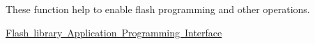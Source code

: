 These function help to enable flash programming and other operations.
\begin{DoxyItemize}
\item \mbox{\hyperlink{group__flashapi}{Flash library Application Programming Interface}} 
\end{DoxyItemize}